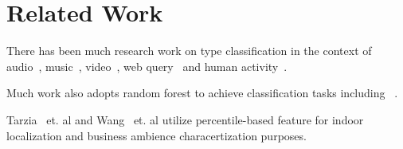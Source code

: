 \section{Related Work}
There has been much research work on type classification in the context of audio~\cite{audio1,audio2}, music~\cite{music1,music2}, video~\cite{video1,video2}, web query~\cite{query1,query2} and human activity~\cite{activity1, activity2}.

Much work also adopts random forest to achieve classification tasks including ~\cite{RF1,RF2,RF3,cvpr}.

Tarzia~\cite{ABS} et. al and Wang~\cite{business} et. al utilize percentile-based feature for indoor localization and business ambience characertization purposes.
